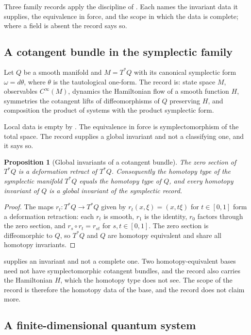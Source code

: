 \documentclass[11pt,letterpaper]{article}
\newtheorem{proposition}[theorem]{Proposition}
\theoremstyle{definition}
\theoremstyle{remark}
\begin{document}
Three family records apply the discipline of . Each names the invariant data it supplies, the equivalence in force, and the scope in which the data is complete; where a field is absent the record says so.

\subsection{A cotangent bundle in the symplectic family}
\label{sec:cotangent}

Let $Q$ be a smooth manifold and $M = T^*Q$ with its canonical symplectic form $\omega = d\theta$, where $\theta$ is the tautological one-form. The record is: state space $M$, observables $C^\infty(M)$, dynamics the Hamiltonian flow of a smooth function $H$, symmetries the cotangent lifts of diffeomorphisms of $Q$ preserving $H$, and composition the product of systems with the product symplectic form.

Local data is empty by . The equivalence in force is symplectomorphism of the total space. The record supplies a global invariant and not a classifying one, and it says so.

\begin{proposition}[Global invariants of a cotangent bundle]
\label{prop:cotangent}
The zero section of $T^*Q$ is a deformation retract of $T^*Q$. Consequently the homotopy type of the symplectic manifold $T^*Q$ equals the homotopy type of $Q$, and every homotopy invariant of $Q$ is a global invariant of the symplectic record.
\end{proposition}

\begin{proof}
The maps $r_t \colon T^*Q \to T^*Q$ given by $r_t(x, \xi) = (x, t\xi)$ for $t \in [0,1]$ form a deformation retraction: each $r_t$ is smooth, $r_1$ is the identity, $r_0$ factors through the zero section, and $r_s \circ r_t = r_{st}$ for $s, t \in [0,1]$. The zero section is diffeomorphic to $Q$, so $T^*Q$ and $Q$ are homotopy equivalent and share all homotopy invariants.
\end{proof}

 supplies an invariant and not a complete one. Two homotopy-equivalent bases need not have symplectomorphic cotangent bundles, and the record also carries the Hamiltonian $H$, which the homotopy type does not see. The scope of the record is therefore the homotopy data of the base, and the record does not claim more.

\subsection{A finite-dimensional quantum system}
\label{sec:worked-calg}
\end{document}
